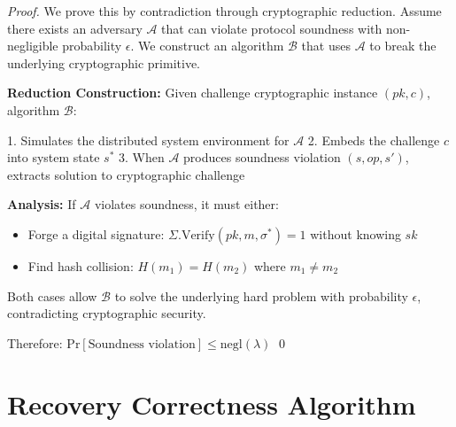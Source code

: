 \documentclass[11pt,a4paper]{article}
\theoremstyle{definition}
\theoremstyle{remark}
\renewcommand{\Pr}{\text{Pr}}
\newcommand{\negl}{\text{negl}}
\begin{document}
\begin{proof}
We prove this by contradiction through cryptographic reduction. Assume there exists an adversary $\mathcal{A}$ that can violate protocol soundness with non-negligible probability $\epsilon$. We construct an algorithm $\mathcal{B}$ that uses $\mathcal{A}$ to break the underlying cryptographic primitive.

\textbf{Reduction Construction:}
Given challenge cryptographic instance $(pk, c)$, algorithm $\mathcal{B}$:

1. Simulates the distributed system environment for $\mathcal{A}$
2. Embeds the challenge $c$ into system state $s^*$
3. When $\mathcal{A}$ produces soundness violation $(s, op, s')$, extracts solution to cryptographic challenge

\textbf{Analysis:} If $\mathcal{A}$ violates soundness, it must either:
\begin{itemize}
    \item Forge a digital signature: $\Sigma.\text{Verify}(pk, m, \sigma^*) = 1$ without knowing $sk$
    \item Find hash collision: $H(m_1) = H(m_2)$ where $m_1 \neq m_2$
\end{itemize}

Both cases allow $\mathcal{B}$ to solve the underlying hard problem with probability $\epsilon$, contradicting cryptographic security.

Therefore: $\Pr[\text{Soundness violation}] \leq \negl(\lambda)$ \qed
\end{proof}

\section{Recovery Correctness Algorithm}
\end{document}
